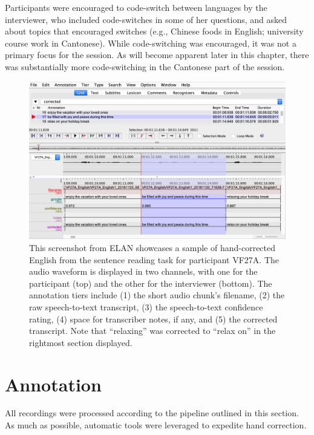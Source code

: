 Participants were encouraged to code-switch between languages by the interviewer, who included code-switches in some of her questions, and asked about topics that encouraged switches (e.g., Chinese foods in English; university course work in Cantonese). While code-switching was encouraged, it was not a primary focus for the session. As will become apparent later in this chapter, there was substantially more code-switching in the Cantonese part of the session.

\begin{figure}[ht]
\begin{center}
\includegraphics[width=\textwidth]{figures/2-elan_screenshot.png} 
\caption{This screenshot from ELAN showcases a sample of hand-corrected English from the sentence reading task for participant VF27A. The audio waveform is displayed in two channels, with one for the participant (top) and the other for the interviewer (bottom). The annotation tiers include (1) the short audio chunk's filename, (2) the raw speech-to-text transcript, (3) the speech-to-text confidence rating, (4) space for transcriber notes, if any, and (5) the corrected transcript. Note that ``relaxing'' was corrected to ``relax on'' in the rightmost section displayed.}
\label{ch2:fig:elan}
\end{center}
\end{figure}

\section{Annotation}\label{ch2:sec:annotation}
All recordings were processed according to the pipeline outlined in this section. As much as possible, automatic tools were leveraged to expedite hand correction. 

